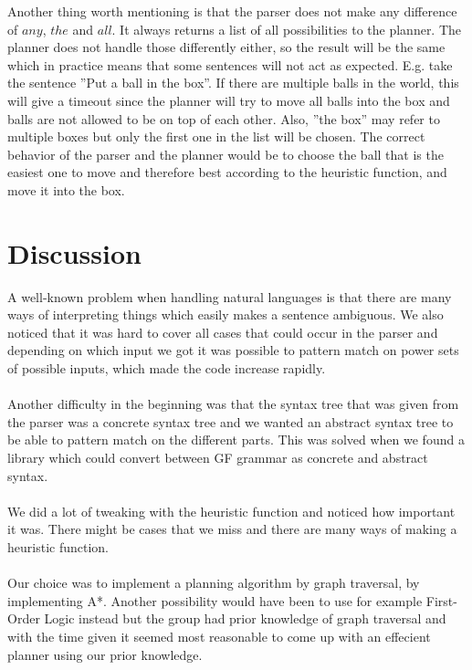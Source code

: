 Another thing worth mentioning is that the parser does not make any difference
of $any$, $the$ and $all$. It always returns a list of all possibilities to the
planner. The planner does not handle those differently either, so the result
will be the same which in practice means that some sentences will not act as
expected. E.g.  take the sentence ''Put a ball in the box''. If there are
multiple balls in the world, this will give a timeout since the planner will try
to move all balls into the box and balls are not allowed to be on top of each
other. Also, ''the box'' may refer to multiple boxes but only the first one in
the list will be chosen. The correct behavior of the parser and the planner
would be to choose the ball that is the easiest one to move and therefore best
according to the heuristic function, and move it into the box.

\section{Discussion}
A well-known problem when handling natural languages is that there are many ways of interpreting
things which easily makes a sentence ambiguous. We also noticed that it was
hard to cover all cases that could occur in the parser and depending on which
input we got it was possible to pattern match on power sets of possible inputs,
which made the code increase rapidly. \\\\
Another difficulty in the beginning was that the syntax tree that was given
from the parser was a concrete syntax tree and we wanted an abstract syntax
tree to be able to pattern match on the different parts. This was solved when
we found a library which could convert between GF grammar as concrete and
abstract syntax. \\\\
We did a lot of tweaking with the heuristic function and noticed how important it
was. There might be cases that we miss and there are many ways of making a
heuristic function.
\\\\
Our choice was to implement a planning algorithm by graph traversal, by
implementing A*. Another possibility would have been to use for example First-Order
Logic instead but the group had prior knowledge of graph traversal and with the time 
given it seemed most reasonable to come up with an effecient planner using our prior knowledge. 
\\\\

